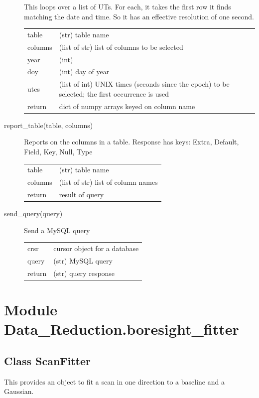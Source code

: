 \documentclass[letterpaper,11pt]{report}
\begin{document}
\begin{description}
    This loops over a list of UTs.  For each, it takes the first row it finds 
    matching the date and time.  So it has an effective resolution of one second.\\
    \begin{tabular}{lp{3.75in}}
        table & (str) table name \\
        columns & (list of str) list of columns to be selected \\
        year & (int) \\
        doy & (int) day of year \\
        utcs & (list of int) UNIX times (seconds since the epoch) to be 
        selected; the first occurrence is used \\
        return & dict of numpy arrays keyed on column name \\
    \end{tabular}
    \item[report\_table(table, columns)] Reports on the columns in a table.
    Response has keys: Extra, Default, Field, Key, Null, Type\\
    \begin{tabular}{ll}
        table & (str) table name \\
        columns & (list of str) list of column names \\
        return & result of query \\
    \end{tabular}
    \item[send\_query(query)] Send a MySQL query\\
    \begin{tabular}{ll}
        crsr  & cursor object for a database \\
        query & (str) MySQL query \\
        return & (str) query response
    \end{tabular}
\end{description}

\section{Module {\ttfamily Data\_Reduction.boresight\_fitter}}

\subsection{Class {\ttfamily ScanFitter}}

This provides an object to fit a scan in one direction to a baseline and a 
Gaussian.
\end{document}
